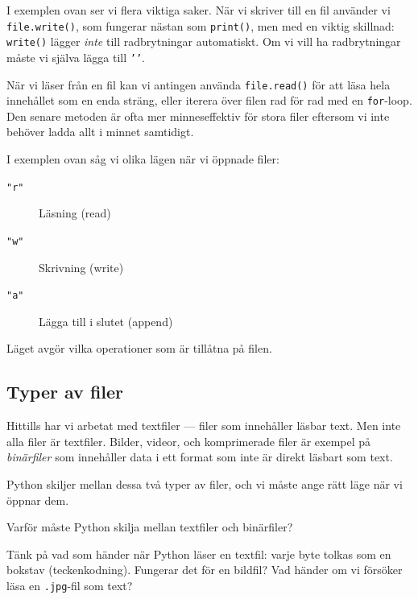 I exemplen ovan ser vi flera viktiga saker. När vi skriver till en fil använder vi \texttt{file.write()}, som fungerar nästan som \texttt{print()}, men med en viktig skillnad: \texttt{write()} lägger \emph{inte} till radbrytningar automatiskt. Om vi vill ha radbrytningar måste vi själva lägga till \texttt{'\n'}.

När vi läser från en fil kan vi antingen använda \texttt{file.read()} för att läsa hela innehållet som en enda sträng, eller iterera över filen rad för rad med en \texttt{for}-loop. Den senare metoden är ofta mer minneseffektiv för stora filer eftersom vi inte behöver ladda allt i minnet samtidigt.

\begin{frame}
  \begin{remark}[Fillägen]
    I exemplen ovan såg vi olika lägen när vi öppnade filer:
    \begin{description}
      \item[\texttt{"r"}] Läsning (\foreignlanguage{english}{read})
      \item[\texttt{"w"}] Skrivning (\foreignlanguage{english}{write})
      \item[\texttt{"a"}] Lägga till i slutet (\foreignlanguage{english}{append})
    \end{description}
    Läget avgör vilka operationer som är tillåtna på filen.
  \end{remark}
\end{frame}

\subsection{Typer av filer}

Hittills har vi arbetat med textfiler --- filer som innehåller läsbar text. Men inte alla filer är textfiler. Bilder, videor, och komprimerade filer är exempel på \emph{binärfiler} som innehåller data i ett format som inte är direkt läsbart som text.

Python skiljer mellan dessa två typer av filer, och vi måste ange rätt läge när vi öppnar dem.

\begin{frame}
  \begin{exercise}
    Varför måste Python skilja mellan textfiler och binärfiler?

    Tänk på vad som händer när Python läser en textfil: varje byte tolkas som
    en bokstav (teckenkodning). Fungerar det för en bildfil? Vad händer om vi
    försöker läsa en \texttt{.jpg}-fil som text?
  \end{exercise}
\end{frame}

